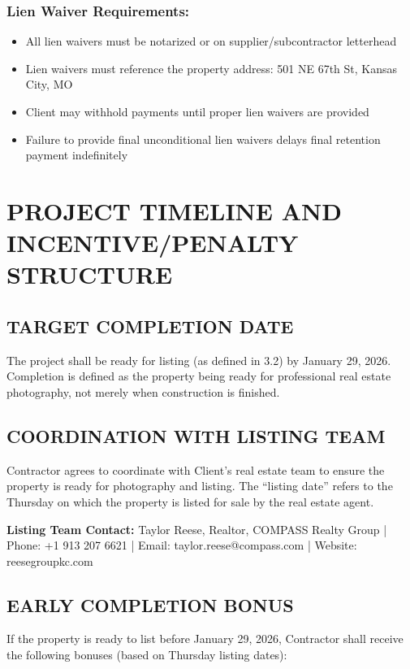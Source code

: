 \documentclass[10pt,letterpaper]{article}
\begin{document}
\subsubsection{Lien Waiver Requirements:}
\begin{itemize}[leftmargin=*]
\item All lien waivers must be notarized or on supplier/subcontractor letterhead
\item Lien waivers must reference the property address: 501 NE 67th St, Kansas City, MO
\item Client may withhold payments until proper lien waivers are provided
\item Failure to provide final unconditional lien waivers delays final retention payment indefinitely
\end{itemize}

\section{PROJECT TIMELINE AND INCENTIVE/PENALTY STRUCTURE}

\subsection{TARGET COMPLETION DATE}
The project shall be ready for listing (as defined in 3.2) by January 29, 2026. Completion is defined as the property being ready for professional real estate photography, not merely when construction is finished.

\subsection{COORDINATION WITH LISTING TEAM}
Contractor agrees to coordinate with Client's real estate team to ensure the property is ready for photography and listing. The ``listing date'' refers to the Thursday on which the property is listed for sale by the real estate agent.

\noindent\textbf{Listing Team Contact:} Taylor Reese, Realtor, COMPASS Realty Group | Phone: +1 913 207 6621 | Email: taylor.reese@compass.com | Website: reesegroupkc.com

\subsection{EARLY COMPLETION BONUS}
If the property is ready to list before January 29, 2026, Contractor shall receive the following bonuses (based on Thursday listing dates):
\end{document}
